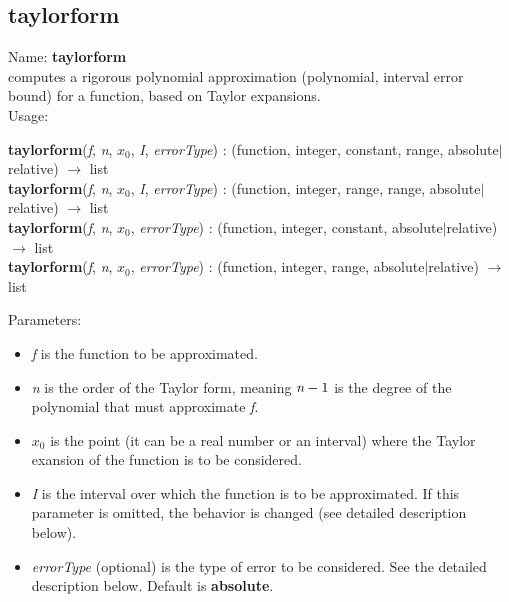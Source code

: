 \subsection{taylorform}
\label{labtaylorform}
\noindent Name: \textbf{taylorform}\\
computes a rigorous polynomial approximation (polynomial, interval error bound) for a function, based on Taylor expansions.\\
\noindent Usage: 
\begin{center}
\textbf{taylorform}(\emph{f}, \emph{n}, \emph{$x_0$}, \emph{I}, \emph{errorType}) : (\textsf{function}, \textsf{integer}, \textsf{constant}, \textsf{range}, \textsf{absolute$|$relative}) $\rightarrow$ \textsf{list}\\
\textbf{taylorform}(\emph{f}, \emph{n}, \emph{$x_0$}, \emph{I}, \emph{errorType}) : (\textsf{function}, \textsf{integer}, \textsf{range}, \textsf{range}, \textsf{absolute$|$relative}) $\rightarrow$ \textsf{list}\\
\textbf{taylorform}(\emph{f}, \emph{n}, \emph{$x_0$}, \emph{errorType}) : (\textsf{function}, \textsf{integer}, \textsf{constant}, \textsf{absolute$|$relative}) $\rightarrow$ \textsf{list}\\
\textbf{taylorform}(\emph{f}, \emph{n}, \emph{$x_0$}, \emph{errorType}) : (\textsf{function}, \textsf{integer}, \textsf{range}, \textsf{absolute$|$relative}) $\rightarrow$ \textsf{list}\\
\end{center}
Parameters: 
\begin{itemize}
\item \emph{f} is the function to be approximated.
\item \emph{n} is the order of the Taylor form, meaning $\emph{n}-1$ is the degree of the polynomial that must approximate \emph{f}.
\item \emph{$x_0$} is the point (it can be a real number or an interval) where the Taylor exansion of the function is to be considered.
\item \emph{I} is the interval over which the function is to be approximated. If this parameter is omitted, the behavior is changed (see detailed description below).
\item \emph{errorType} (optional) is the type of error to be considered. See the detailed description below. Default is \textbf{absolute}.
\end{itemize}
